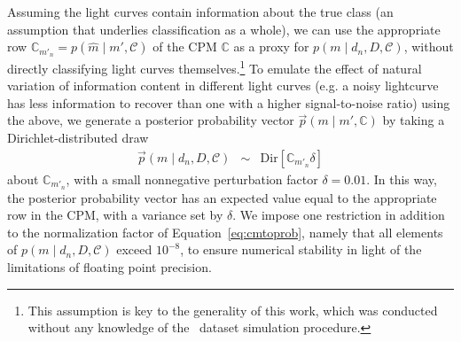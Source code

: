 Assuming the light curves contain information about the true class (an assumption that underlies classification as a whole), we can use the appropriate row $\mathbb{C}_{m'_{n}} = p(\hat{m} \mid m', \mathcal{C})$ of the CPM $\mathbb{C}$ as a proxy for $p(m \mid d_{n}, D, \mathcal{C})$, without directly classifying light curves themselves.\footnote{This assumption is key to the generality of this work, which was conducted without any knowledge of the \plasticc\ dataset simulation procedure.}
To emulate the effect of natural variation of information content in different light curves (e.g. a noisy lightcurve has less information to recover than one with a higher signal-to-noise ratio) using the above, we generate a posterior probability vector $\vec{p}(m \mid m', \mathbb{C})$ by taking a Dirichlet-distributed draw
\begin{eqnarray}
  \label{eq:cmtoprob}
  \vec{p}(m \mid d_{n}, D, \mathcal{C}) &\sim& \mathrm{Dir}[\mathbb{C}_{m'_{n}} \delta]
\end{eqnarray}
about $\mathbb{C}_{m'_{n}}$, with a small nonnegative perturbation factor $\delta = 0.01$.
In this way, the posterior probability vector has an expected value equal to the appropriate row in the CPM, with a variance set by $\delta$.
We impose one restriction in addition to the normalization factor of Equation~\ref{eq:cmtoprob}, namely that all elements of $p(m \mid d_{n}, D, \mathcal{C})$ exceed $10^{-8}$, to ensure numerical stability in light of the limitations of floating point precision.

